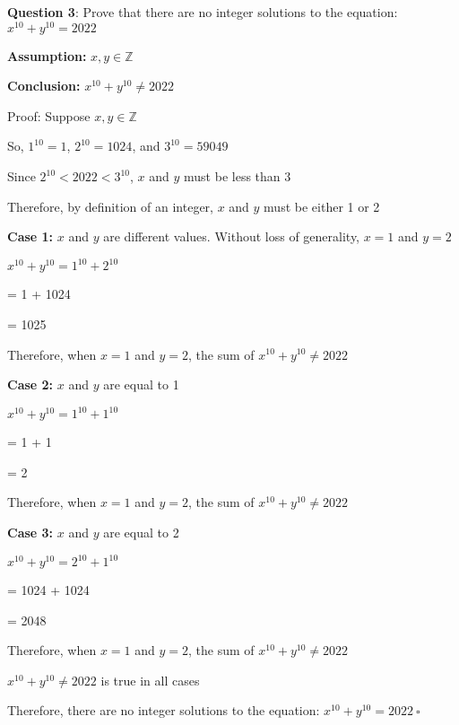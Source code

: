 \documentclass{article} %
\newcommand{\question}[2][]{\begin{flushleft}
        \textbf{Question #1}: #2
\end{flushleft}}
\begin{document}
    \question[3]{Prove that there are no integer solutions to the equation: $x^{10} + y^{10} = 2022$}

    \textbf{Assumption:} $x, y \in \mathbb{Z}$
    
    \textbf{Conclusion:} $x^{10} + y^{10} \neq 2022$

    \vspace*{0.3cm}

    Proof: Suppose $x, y \in \mathbb{Z}$

    So, $1^{10} = 1$, $2^{10} = 1024$, and $3^{10} = 59049$

    Since $2^{10} < 2022 < 3^{10}$, $x$ and $y$ must be less than $3$

    Therefore, by definition of an integer, $x$ and $y$ must be either 1 or 2

    \vspace*{0.1cm}

    \textbf{Case 1:} $x$ and $y$ are different values. Without loss of generality, $x = 1$ and $y = 2$
    
    $x^{10} + y^{10} = 1^{10} + 2^{10}$

    \tabto{2.02cm} = 1 + 1024

    \tabto{2.02cm} = 1025

    Therefore, when $x = 1$ and $y = 2$, the sum of $x^{10} + y^{10} \neq 2022$ 

    \textbf{Case 2:} $x$ and $y$ are equal to 1

    $x^{10} + y^{10} = 1^{10} + 1^{10}$

    \tabto{2.02cm} = 1 + 1

    \tabto{2.02cm} = 2

    Therefore, when $x = 1$ and $y = 2$, the sum of $x^{10} + y^{10} \neq 2022$ 

    \textbf{Case 3:} $x$ and $y$ are equal to 2

    $x^{10} + y^{10} = 2^{10} + 1^{10}$

    \tabto{2.02cm} = 1024 + 1024

    \tabto{2.02cm} = 2048

    Therefore, when $x = 1$ and $y = 2$, the sum of $x^{10} + y^{10} \neq 2022$ 

    \vspace*{0.1cm}

    $x^{10} + y^{10} \neq 2022$ is true in all cases
    
    Therefore, there are no integer solutions to the equation: $x^{10} + y^{10} = 2022\ \square$
\end{document}
